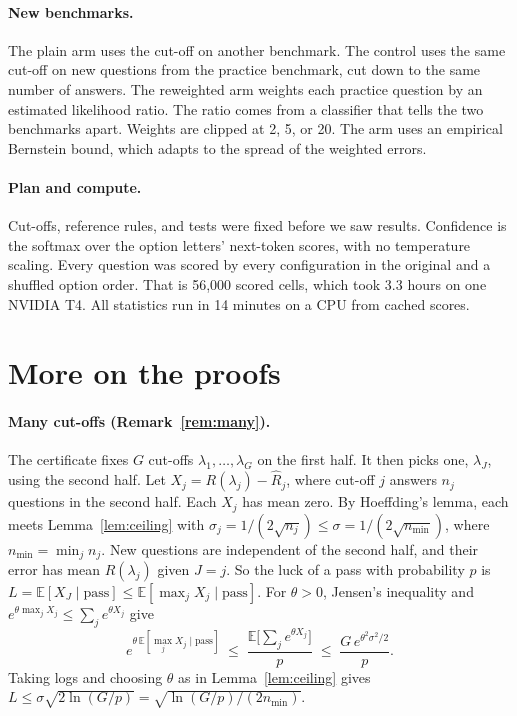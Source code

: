 \documentclass[11pt]{article}
\theoremstyle{plain}
\theoremstyle{definition}
\newcommand{\E}{\mathbb{E}}
\begin{document}
\paragraph{New benchmarks.} The plain arm uses the cut-off on another benchmark. The control uses the same cut-off on new questions from the practice benchmark, cut down to the same number of answers. The reweighted arm weights each practice question by an estimated likelihood ratio. The ratio comes from a classifier that tells the two benchmarks apart. Weights are clipped at 2, 5, or 20. The arm uses an empirical Bernstein bound, which adapts to the spread of the weighted errors.

\paragraph{Plan and compute.} Cut-offs, reference rules, and tests were fixed before we saw results. Confidence is the softmax over the option letters' next-token scores, with no temperature scaling. Every question was scored by every configuration in the original and a shuffled option order. That is 56{,}000 scored cells, which took 3.3 hours on one NVIDIA T4. All statistics run in 14 minutes on a CPU from cached scores.

\section{More on the proofs}
\label{app:proofs}

\paragraph{Many cut-offs (Remark~\ref{rem:many}).} The certificate fixes $G$ cut-offs $\lambda_1, \dots, \lambda_G$ on the first half. It then picks one, $\lambda_J$, using the second half. Let $X_j = R(\lambda_j) - \hat R_j$, where cut-off $j$ answers $n_j$ questions in the second half. Each $X_j$ has mean zero. By Hoeffding's lemma, each meets Lemma~\ref{lem:ceiling} with $\sigma_j = 1/(2\sqrt{n_j}) \le \sigma = 1/(2\sqrt{n_{\min}})$, where $n_{\min} = \min_j n_j$. New questions are independent of the second half, and their error has mean $R(\lambda_j)$ given $J = j$. So the luck of a pass with probability $p$ is $L = \E[X_J \mid \text{pass}] \le \E[\max_j X_j \mid \text{pass}]$. For $\theta > 0$, Jensen's inequality and $e^{\theta\max_j X_j} \le \sum_j e^{\theta X_j}$ give
\[
e^{\theta\,\E[\max_j X_j \mid \text{pass}]} \;\le\; \frac{\E\big[\sum_j e^{\theta X_j}\big]}{p} \;\le\; \frac{G\, e^{\theta^2\sigma^2/2}}{p}.
\]
Taking logs and choosing $\theta$ as in Lemma~\ref{lem:ceiling} gives $L \le \sigma\sqrt{2\ln(G/p)} = \sqrt{\ln(G/p)/(2n_{\min})}$.
\end{document}
